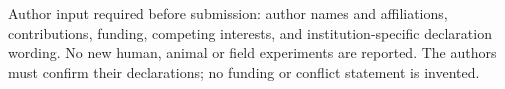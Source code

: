 \documentclass[11pt,a4paper]{article}
\begin{document}
Author input required before submission: author names and affiliations, contributions, funding, competing interests, and institution-specific declaration wording. No new human, animal or field experiments are reported. The authors must confirm their declarations; no funding or conflict statement is invented.

\clearpage


\end{document}
